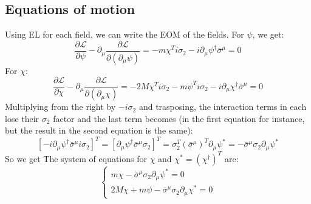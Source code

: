 \documentclass{article}
\begin{document}
\subsection{Equations of motion}
Using EL for each field, we can write the EOM of the fields. For $\psi$, we get:
\begin{equation}
    \frac{\partial \mathcal{L}}{\partial \psi} - \partial_\mu \frac{\partial \mathcal{L}}{\partial\left(\partial_\mu \psi\right)} = -m\chi^T i\sigma_2 - i \partial_\mu \psi^\dagger \bar{\sigma}^\mu = 0
\end{equation}
For $\chi$:
\begin{equation}
    \frac{\partial \mathcal{L}}{\partial \chi} - \partial_\mu \frac{\partial \mathcal{L}}{\partial\left(\partial_\mu \chi\right)} = -2M\chi^T i\sigma_2 - m\psi^T i\sigma_2 - i \partial_\mu \chi^\dagger \bar{\sigma}^\mu = 0
\end{equation}
Multiplying from the right by $-i\sigma_2$ and trasposing, the interaction terms in each lose their $\sigma_2$ factor and the last term becomes (in the first equation for instance, but the result in the second equation is the same):
\begin{equation}
    \left[- i \partial_\mu \psi^\dagger \bar{\sigma}^\mu i \sigma_2\right]^T = \left[\partial_\mu \psi^\dagger \bar{\sigma}^\mu \sigma_2\right]^T = \sigma_2^T (\bar{\sigma}^\mu)^T \partial_\mu \psi^* = - \bar{\sigma}^\mu \sigma_2  \partial_\mu \psi^* 
\end{equation}
So we get The system of equations for $\chi$ and $\chi^* = \left(\chi^\dagger\right)^T$ are:
\begin{equation}
\begin{cases}
    m\chi - \bar{\sigma}^\mu \sigma_2  \partial_\mu \psi^*  = 0
    \\
    2M\chi + m\psi - \bar{\sigma}^\mu \sigma_2  \partial_\mu \chi^* = 0
\end{cases}
\end{equation}
\end{document}
